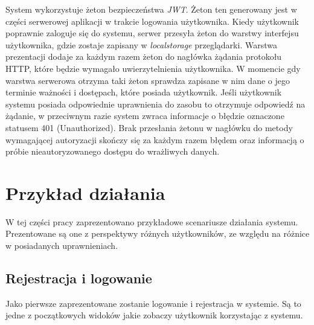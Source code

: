 \documentclass[a4paper,twoside,12pt]{book}
\begin{document}
System wykorzystuje żeton bezpieczeństwa \textit{JWT}. Żeton ten generowany jest w części serwerowej aplikacji w trakcie logowania użytkownika. Kiedy użytkownik poprawnie zaloguje się do systemu, serwer przesyła żeton do warstwy interfejsu użytkownika, gdzie zostaje zapisany w \textit{localstorage} przeglądarki. Warstwa prezentacji dodaje za każdym razem żeton do nagłówka żądania protokołu HTTP, które będzie wymagało uwierzytelnienia użytkownika. W momencie gdy warstwa serwerowa otrzyma taki żeton sprawdza zapisane w nim dane o jego terminie ważności i dostępach, które posiada użytkownik. Jeśli użytkownik systemu posiada odpowiednie uprawnienia do zasobu to otrzymuje odpowiedź na żądanie, w przeciwnym razie system zwraca informacje o błędzie oznaczone statusem 401 (Unauthorized). Brak przesłania żetonu w nagłówku do metody wymagającej autoryzacji skończy się za każdym razem błędem oraz informacją o próbie nieautoryzowanego dostępu do wrażliwych danych.

\section {Przykład działania}
\label{UseExample}
W tej części pracy zaprezentowano przykładowe scenariusze działania systemu. Prezentowane są one z perspektywy różnych użytkowników, ze względu na różnice w posiadanych uprawnieniach.

\subsection{Rejestracja i logowanie}
Jako pierwsze zaprezentowane zostanie logowanie i rejestracja w systemie. Są to jedne z początkowych widoków jakie zobaczy użytkownik korzystając z systemu.
\end{document}
